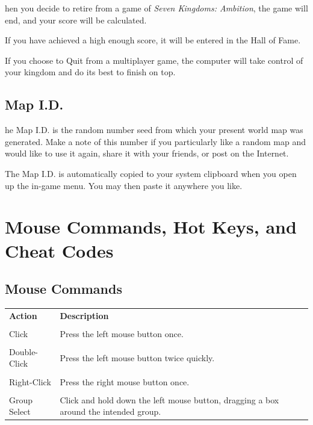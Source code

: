 hen you decide to retire from a game of \textit{Seven
  Kingdoms: Ambition}, the game will end, and your score will be calculated.

If you have achieved a high enough score, it will be entered in the Hall of Fame.

If you choose to Quit from a multiplayer game, the computer will take control of your kingdom and do its best to finish on top.

\subsection{Map I.D.}


he Map I.D. is the random number seed from which your present world map was generated. Make a note of this number if you particularly like a random map and would like to use it again, share it with your friends, or post on the Internet.

The Map I.D. is automatically copied to your system clipboard when you open up
the in-game menu.  You may then paste it anywhere you like.

\section{Mouse Commands, Hot Keys, and Cheat Codes}

\subsection{Mouse Commands}


\begin{tabular}{p{1in} p{3in}}
    \textbf{Action} & \textbf{Description} \\ \\
    Click & Press the left mouse button once. \\ \\
    Double-Click & Press the left mouse button twice quickly. \\ \\
    Right-Click & Press the right mouse button once. \\ \\
    Group Select & Click and hold down the left mouse button, dragging a box around the intended group. \\
\end{tabular}    
    
